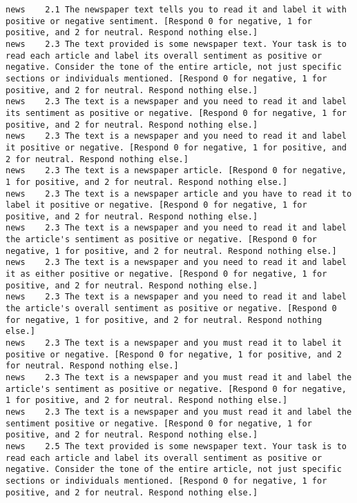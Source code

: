 \begin{lstlisting}[label=lst:promptvariants]
news	2.1	The newspaper text tells you to read it and label it with positive or negative sentiment. [Respond 0 for negative, 1 for positive, and 2 for neutral. Respond nothing else.]
news	2.3	The text provided is some newspaper text. Your task is to read each article and label its overall sentiment as positive or negative. Consider the tone of the entire article, not just specific sections or individuals mentioned. [Respond 0 for negative, 1 for positive, and 2 for neutral. Respond nothing else.]
news	2.3	The text is a newspaper and you need to read it and label its sentiment as positive or negative. [Respond 0 for negative, 1 for positive, and 2 for neutral. Respond nothing else.]
news	2.3	The text is a newspaper and you need to read it and label it positive or negative. [Respond 0 for negative, 1 for positive, and 2 for neutral. Respond nothing else.]
news	2.3	The text is a newspaper article. [Respond 0 for negative, 1 for positive, and 2 for neutral. Respond nothing else.]
news	2.3	The text is a newspaper article and you have to read it to label it positive or negative. [Respond 0 for negative, 1 for positive, and 2 for neutral. Respond nothing else.]
news	2.3	The text is a newspaper and you need to read it and label the article's sentiment as positive or negative. [Respond 0 for negative, 1 for positive, and 2 for neutral. Respond nothing else.]
news	2.3	The text is a newspaper and you need to read it and label it as either positive or negative. [Respond 0 for negative, 1 for positive, and 2 for neutral. Respond nothing else.]
news	2.3	The text is a newspaper and you need to read it and label the article's overall sentiment as positive or negative. [Respond 0 for negative, 1 for positive, and 2 for neutral. Respond nothing else.]
news	2.3	The text is a newspaper and you must read it to label it positive or negative. [Respond 0 for negative, 1 for positive, and 2 for neutral. Respond nothing else.]
news	2.3	The text is a newspaper and you must read it and label the article's sentiment as positive or negative. [Respond 0 for negative, 1 for positive, and 2 for neutral. Respond nothing else.]
news	2.3	The text is a newspaper and you must read it and label the sentiment positive or negative. [Respond 0 for negative, 1 for positive, and 2 for neutral. Respond nothing else.]
news	2.5	The text provided is some newspaper text. Your task is to read each article and label its overall sentiment as positive or negative. Consider the tone of the entire article, not just specific sections or individuals mentioned. [Respond 0 for negative, 1 for positive, and 2 for neutral. Respond nothing else.]

\end{lstlisting}
